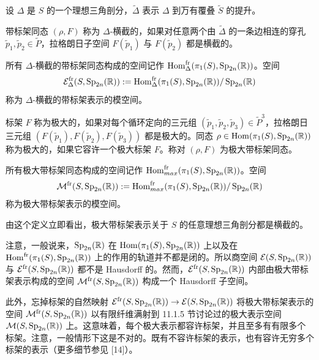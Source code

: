 设 $\Delta$ 是 $S$ 的一个理想三角剖分，$\tilde\Delta$ 表示 $\Delta$ 到万有覆叠 $\tilde S$ 的提升。

\begin{definition}[11.23]
带标架同态 $(\rho,F)$ 称为 $\Delta$-横截的，如果对任意两个由 $\tilde\Delta$ 的一条边相连的穿孔 $\tilde p_1,\tilde p_2\in\tilde P$，拉格朗日子空间 $F(\tilde p_1)$ 与 $F(\tilde p_2)$ 都是横截的。
\end{definition}

所有 $\Delta$-横截的带标架同态构成的空间记作 $\operatorname{Hom}^{\mathrm{fr}}_{\Delta}(\pi_1(S),\operatorname{Sp}_{2n}(\mathbb{R}))$。空间
\[
\mathcal{E}^{\mathrm{fr}}_{\Delta}(S,\operatorname{Sp}_{2n}(\mathbb{R})):=\operatorname{Hom}^{\mathrm{fr}}_{\Delta}(\pi_1(S),\operatorname{Sp}_{2n}(\mathbb{R}))/\operatorname{Sp}_{2n}(\mathbb{R})
\]
称为 $\Delta$-横截的带标架表示的模空间。

\begin{definition}[11.24]
标架 $F$ 称为极大的，如果对每个循环定向的三元组 $(\tilde p_1,\tilde p_2,\tilde p_3)\in\tilde P^{3}$，拉格朗日三元组 $(F(\tilde p_1),F(\tilde p_2),F(\tilde p_3))$ 都是极大的。同态 $\rho\in\operatorname{Hom}(\pi_1(S),\operatorname{Sp}_{2n}(\mathbb{R}))$ 称为极大的，如果它容许一个极大标架 $F$。称对 $(\rho,F)$ 为极大带标架同态。
\end{definition}


所有极大带标架同态构成的空间记作 $\operatorname{Hom}^{\mathrm{fr}}_{max}(\pi_1(S),\operatorname{Sp}_{2n}(\mathbb{R}))$。空间
\[
\mathcal{M}^{\mathrm{fr}}(S,\operatorname{Sp}_{2n}(\mathbb{R})):=\operatorname{Hom}^{\mathrm{fr}}_{max}(\pi_1(S),\operatorname{Sp}_{2n}(\mathbb{R}))/\operatorname{Sp}_{2n}(\mathbb{R})
\]
称为极大带标架表示的模空间。

\begin{remark}[11.25]
由这个定义立即看出，极大带标架表示关于 $S$ 的任意理想三角剖分都是横截的。
\end{remark}

\begin{remark}[11.26]
注意，一般说来，$\operatorname{Sp}_{2n}(\mathbb{R})$ 在 $\operatorname{Hom}(\pi_1(S),\operatorname{Sp}_{2n}(\mathbb{R}))$ 上以及在 $\operatorname{Hom}^{\mathrm{fr}}(\pi_1(S),\operatorname{Sp}_{2n}(\mathbb{R}))$ 上的作用的轨道并不都是闭的。所以商空间 $\mathcal{E}(S,\operatorname{Sp}_{2n}(\mathbb{R}))$ 与 $\mathcal{E}^{\mathrm{fr}}(S,\operatorname{Sp}_{2n}(\mathbb{R}))$ 都不是 Hausdorff 的。然而，$\mathcal{E}^{\mathrm{fr}}(S,\operatorname{Sp}_{2n}(\mathbb{R}))$ 内部由极大带标架表示构成的空间 $\mathcal{M}^{\mathrm{fr}}(S,\operatorname{Sp}_{2n}(\mathbb{R}))$ 构成一个 Hausdorff 子空间。

此外，忘掉标架的自然映射 $\mathcal{E}^{\mathrm{fr}}(S,\operatorname{Sp}_{2n}(\mathbb{R}))\to\mathcal{E}(S,\operatorname{Sp}_{2n}(\mathbb{R}))$ 将极大带标架表示的空间 $\mathcal{M}^{\mathrm{fr}}(S,\operatorname{Sp}_{2n}(\mathbb{R}))$ 以有限纤维满射到 11.1.5 节讨论过的极大表示空间 $\mathcal{M}(S,\operatorname{Sp}_{2n}(\mathbb{R}))$ 上。这意味着，每个极大表示都容许标架，并且至多有有限多个标架。注意，一般情形下这是不对的。既有不容许标架的表示，也有容许无穷多个标架的表示（更多细节参见 [14]）。
\end{remark}

